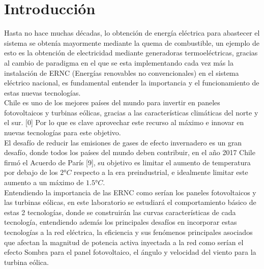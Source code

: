 \section{Introducción}
Hasta no hace muchas décadas, lo obtención de energía eléctrica para abastecer el sistema se obtenía mayormente mediante la quema de combustible, un ejemplo de esto es la obtención de electricidad mediante generadoras termoeléctricas, gracias al cambio de paradigma en el que se esta implementando cada vez más la instalación de ERNC (Energías renovables no convencionales)  en el sistema eléctrico nacional, es fundamental entender la importancia y el funcionamiento de estas nuevas tecnologías.\\

Chile es uno de los mejores países del mundo para invertir en paneles fotovoltaicos y turbinas eólicas, gracias a las características climáticas del norte y el sur. [0] Por lo que es clave aprovechar este recurso al máximo e innovar en nuevas tecnologías para este objetivo. \\

El desafío de reducir las emisiones de gases de efecto invernadero es un gran desafío, donde todos los países del mundo deben contribuir, en el año 2017 Chile firmó  el Acuerdo de París [9], su objetivo es limitar el aumento de temperatura por debajo de los $2°C$ respecto a la era preindustrial, e idealmente limitar este aumento a un máximo de $1.5°C$.\\

Entendiendo la importancia de las ERNC como serían los paneles fotovoltaicos y las turbinas eólicas, en este laboratorio se estudiará el comportamiento básico de estas 2 tecnologías, donde se construirán las curvas características de cada tecnología, entendiendo además los principales desafíos en incorporar estas tecnologías a la red eléctrica, la eficiencia y sus fenómenos principales asociados que afectan la magnitud de potencia activa inyectada a la red como serían el efecto Sombra para el panel fotovoltaico, el ángulo y velocidad del viento para la turbina eólica.